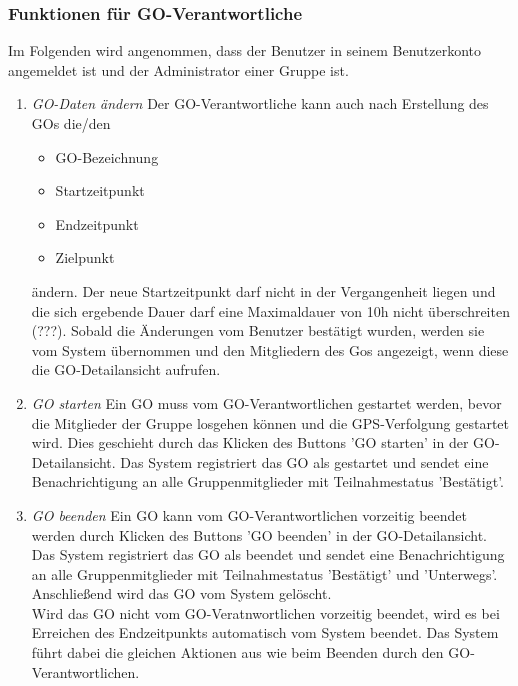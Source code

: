 \documentclass[parskip=full]{scrartcl}
\def\threedigits#1{%
  \ifnum#1<100 0\fi
  \ifnum#1<10 0\fi
  \number#1}
\begin{document}
\subsubsection{Funktionen für GO-Verantwortliche}
Im Folgenden wird angenommen, dass der Benutzer in seinem Benutzerkonto angemeldet ist und der Administrator einer Gruppe ist.

\begin{enumerate}[label={\textbf{/F\protect\threedigits{\theenumi}0/}}, leftmargin=*, resume]	
	\item \textit{GO-Daten ändern}
	Der GO-Verantwortliche kann auch nach Erstellung des GOs die/den
	\begin{itemize}
		\item GO-Bezeichnung
		\item Startzeitpunkt
		\item Endzeitpunkt
		\item Zielpunkt
	\end{itemize}
	ändern. Der neue Startzeitpunkt darf nicht in der Vergangenheit liegen und die sich ergebende Dauer darf eine Maximaldauer von 10h nicht überschreiten (???). Sobald die Änderungen vom Benutzer bestätigt wurden, werden sie vom System übernommen und den Mitgliedern des Gos angezeigt, wenn diese die GO-Detailansicht aufrufen.
	
	\item \textit{GO starten} Ein GO muss vom GO-Verantwortlichen gestartet werden, bevor die Mitglieder der Gruppe \gls{losgehen} können und die GPS-Verfolgung gestartet wird. Dies geschieht durch das Klicken des Buttons 'GO starten' in der GO-Detailansicht. Das System registriert das GO als gestartet und sendet eine Benachrichtigung an alle Gruppenmitglieder mit Teilnahmestatus 'Bestätigt'.
	
	\item \textit{GO beenden} Ein GO kann vom GO-Verantwortlichen vorzeitig beendet werden durch Klicken des Buttons 'GO beenden' in der GO-Detailansicht. Das System registriert das GO als beendet und sendet eine Benachrichtigung an alle Gruppenmitglieder mit Teilnahmestatus 'Bestätigt' und 'Unterwegs'. Anschließend wird das GO vom System gelöscht. \\
	Wird das GO nicht vom GO-Veratnwortlichen vorzeitig beendet, wird es bei Erreichen des Endzeitpunkts automatisch vom System beendet. Das System führt dabei die gleichen Aktionen aus wie beim Beenden durch den GO-Verantwortlichen.
\end{enumerate}
\end{document}
